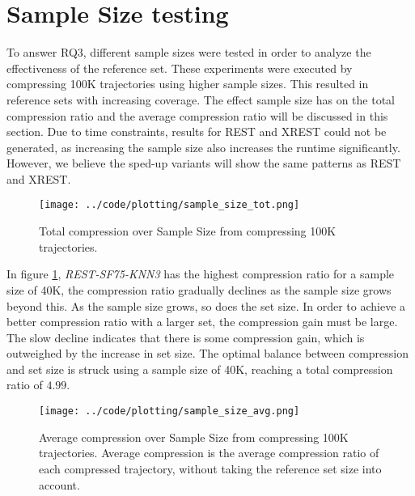 \section{Sample Size testing}\label{sec:sample_size}
To answer RQ3, different sample sizes were tested in order to analyze the effectiveness of the reference set. These experiments were executed by compressing 100K trajectories using higher sample sizes. This resulted in reference sets with increasing coverage. The effect sample size has on the total compression ratio and the average compression ratio will be discussed in this section. Due to time constraints, results for REST and XREST could not be generated, as increasing the sample size also increases the runtime significantly. However, we believe the sped-up variants will show the same patterns as REST and XREST.

\begin{figure}[h]
    \begin{minipage}{0.99\linewidth}
        \centering
        \texttt{[image: ../code/plotting/sample\_size\_tot.png]}
        \caption{Total compression over Sample Size from compressing 100K trajectories.}
        \label{fig:sample_tot}
    \end{minipage}
\end{figure}

In figure \ref{fig:sample_tot}, \textit{REST-SF75-KNN3} has the highest compression ratio for a sample size of 40K, the compression ratio gradually declines as the sample size grows beyond this. As the sample size grows, so does the set size. In order to achieve a better compression ratio with a larger set, the compression gain must be large. The slow decline indicates that there is some compression gain, which is outweighed by the increase in set size. The optimal balance between compression and set size is struck using a sample size of 40K, reaching a total compression ratio of $4.99$.

\begin{figure}[h]
    \begin{minipage}{0.99\linewidth}
        \centering
        \texttt{[image: ../code/plotting/sample\_size\_avg.png]}
        \caption{Average compression over Sample Size from compressing 100K trajectories. Average compression is the average compression ratio of each compressed trajectory, without taking the reference set size into account.}
        \label{fig:sample_avg}
    \end{minipage}
\end{figure}

